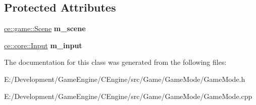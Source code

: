 \subsection*{Protected Attributes}
\begin{DoxyCompactItemize}
\item 
\mbox{\label{classce_1_1game_1_1_game_mode_afe021159648ad025aa1657a5096617c0}} 
\hyperlink{classce_1_1game_1_1_scene}{ce\+::game\+::\+Scene} {\bfseries m\+\_\+scene}
\item 
\mbox{\label{classce_1_1game_1_1_game_mode_a784f9c9163634f8c76858f3eb19f4f11}} 
\hyperlink{classce_1_1core_1_1_input}{ce\+::core\+::\+Input} {\bfseries m\+\_\+input}
\end{DoxyCompactItemize}


The documentation for this class was generated from the following files\+:\begin{DoxyCompactItemize}
\item 
E\+:/\+Development/\+Game\+Engine/\+C\+Engine/src/\+Game/\+Game\+Mode/Game\+Mode.\+h\item 
E\+:/\+Development/\+Game\+Engine/\+C\+Engine/src/\+Game/\+Game\+Mode/Game\+Mode.\+cpp\end{DoxyCompactItemize}
